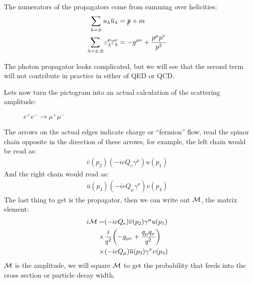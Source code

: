 The numerators of the propagators come from summing over helicities:
\begin{align*}
  \sum_{\lambda=\pm}u_\lambda\overline{u}_\lambda&=\slashed{p}+m\\
  \sum_{\lambda=\pm,0}\varepsilon^\mu_\lambda\overline{\varepsilon}^\nu_\lambda&=
  -g^{\mu\nu}+\frac{p^\mu p^\nu}{p^2}
\end{align*}

The photon propagator looks complicated, but we will see that the second term will not contribute in practice in either of QED or QCD.\@

Lets now turn the pictogram into an actual calculation of the scattering amplitude:
\begin{figure}[H]
  \centering
  \caption{$e^+e^-\to\mu^+\mu^-$}\label{fig:feynman}
\end{figure}
The arrows on the actual edges indicate charge or ``fermion'' flow, read the spinor chain opposite in the direction of these arrows, for example, the left chain would be read as:
\begin{align*}
  \bar{v}(p_2)(-ieQ_e\gamma^\mu)u(p_1)
\end{align*}
And the right chain would read as:
\begin{align*}
  \bar{u}(p_3)(-ieQ_\mu\gamma^\nu)v(p_4)
\end{align*}
The last thing to get is the propagator, then we can write out $\mathcal{M}$, the matrix element:
\begin{align*}
  i\mathcal{M}=&(-ieQ_e)\overline{v}(p_2)\gamma^\mu u(p_1)\\
  \times&\frac{i}{q^2}\qty(-g_{\mu\nu}+\frac{q_\mu q_\nu}{q^2})\\
  \times&(-ieQ_\mu)\overline{u}(p_3)\gamma^\nu v(p_4)
\end{align*}
$\mathcal{M}$ is the amplitude, we will square $\mathcal{M}$ to get the probability that feeds into the cross section or particle decay width.

